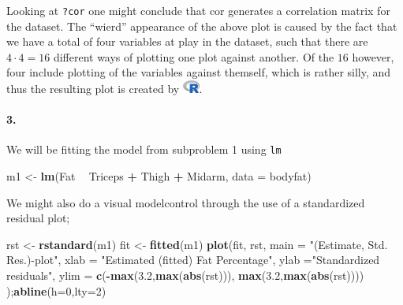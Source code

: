 \documentclass[
]{article}
\newenvironment{Shaded}{\begin{snugshade}}{\end{snugshade}}
\newcommand{\DataTypeTok}[1]{\textcolor[rgb]{0.13,0.29,0.53}{#1}}
\newcommand{\DecValTok}[1]{\textcolor[rgb]{0.00,0.00,0.81}{#1}}
\newcommand{\FloatTok}[1]{\textcolor[rgb]{0.00,0.00,0.81}{#1}}
\newcommand{\KeywordTok}[1]{\textcolor[rgb]{0.13,0.29,0.53}{\textbf{#1}}}
\newcommand{\NormalTok}[1]{#1}
\newcommand{\OperatorTok}[1]{\textcolor[rgb]{0.81,0.36,0.00}{\textbf{#1}}}
\newcommand{\StringTok}[1]{\textcolor[rgb]{0.31,0.60,0.02}{#1}}
\begin{document}
Looking at \texttt{?cor} one might conclude that cor generates a
correlation matrix for the dataset. The ``wierd'' appearance of the
above plot is caused by the fact that we have a total of four variables
at play in the dataset, such that there are \(4\cdot 4 = 16\) different
ways of plotting one plot against another. Of the \(16\) however, four
include plotting of the variables against themself, which is rather
silly, and thus the resulting plot is created by
\includegraphics[width=\textwidth,height=0.16667in]{R_logo.png}.

\hypertarget{section-65}{%
\paragraph{\texorpdfstring{\textbf{3.}}{3.}}\label{section-65}}

We will be fitting the model from subproblem 1 using \texttt{lm}

\begin{Shaded}
\begin{Highlighting}[]
\NormalTok{m1 <-}\StringTok{ }\KeywordTok{lm}\NormalTok{(Fat }\OperatorTok{~}\StringTok{ }\NormalTok{Triceps }\OperatorTok{+}\StringTok{ }\NormalTok{Thigh }\OperatorTok{+}\StringTok{ }\NormalTok{Midarm, }\DataTypeTok{data =}\NormalTok{ bodyfat)}
\end{Highlighting}
\end{Shaded}

We might also do a visual modelcontrol through the use of a standardized
residual plot;

\begin{Shaded}
\begin{Highlighting}[]
\NormalTok{rst <-}\StringTok{ }\KeywordTok{rstandard}\NormalTok{(m1)}
\NormalTok{fit <-}\StringTok{ }\KeywordTok{fitted}\NormalTok{(m1)}
\KeywordTok{plot}\NormalTok{(fit, rst, }\DataTypeTok{main =} \StringTok{"(Estimate, Std. Res.)-plot"}\NormalTok{, }\DataTypeTok{xlab =} \StringTok{"Estimated (fitted) Fat Percentage"}\NormalTok{, }\DataTypeTok{ylab =}\StringTok{"Standardized residuals"}\NormalTok{, }\DataTypeTok{ylim =} \KeywordTok{c}\NormalTok{(}\OperatorTok{-}\KeywordTok{max}\NormalTok{(}\FloatTok{3.2}\NormalTok{,}\KeywordTok{max}\NormalTok{(}\KeywordTok{abs}\NormalTok{(rst))), }\KeywordTok{max}\NormalTok{(}\FloatTok{3.2}\NormalTok{,}\KeywordTok{max}\NormalTok{(}\KeywordTok{abs}\NormalTok{(rst)))) );}\KeywordTok{abline}\NormalTok{(}\DataTypeTok{h=}\DecValTok{0}\NormalTok{,}\DataTypeTok{lty=}\DecValTok{2}\NormalTok{)}
\end{Highlighting}
\end{Shaded}
\end{document}
